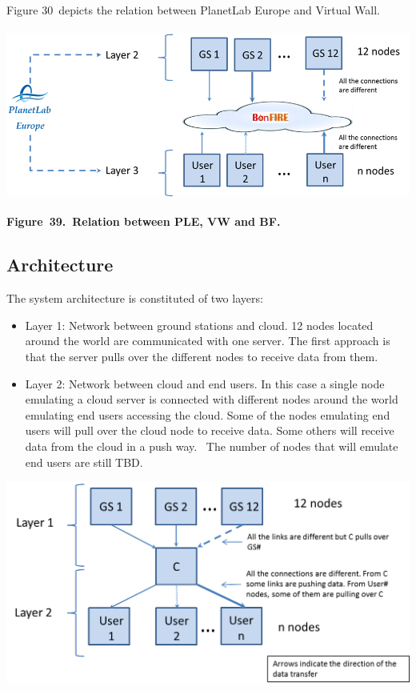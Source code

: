 \documentclass[a4paper]{article}
\newcommand\liststyleLFOxxxvi{%
\renewcommand\labelitemi{[F0B7?]}
\renewcommand\labelitemii{o}
\renewcommand\labelitemiii{[F0A7?]}
\renewcommand\labelitemiv{[F0B7?]}
}
\begin{document}
\bigskip

Figure 30\ depicts the relation between PlanetLab Europe and Virtual
Wall.


\bigskip


\bigskip

{\centering 
\includegraphics[width=5.45091in,height=2.21099in]{out-img47.png} \par}

{\centering\bfseries
Figure\ 39.\ Relation between PLE, VW and BF.
\par}

\subsection[Architecture]{Architecture}
\hypertarget{Toc381777243}{}
\bigskip

The system architecture is constituted of two layers:

\liststyleLFOxxxvi
\begin{itemize}
\item Layer 1: Network between ground stations and cloud. 12 nodes
located around the world are communicated with one server. The first
approach is that the server pulls over the different nodes to receive
data from them.
\item Layer 2: Network between cloud and end users. In this case a
single node emulating a cloud server is connected with different nodes
around the world emulating end users accessing the cloud. Some of the
nodes emulating end users will pull over the cloud node to receive
data. Some others will receive data from the cloud in a push way. \ The
number of nodes that will emulate end users are still TBD.
\end{itemize}

\bigskip

{\centering 
\includegraphics[width=5.26134in,height=2.6487in]{out-img48.png} \par}
\end{document}
